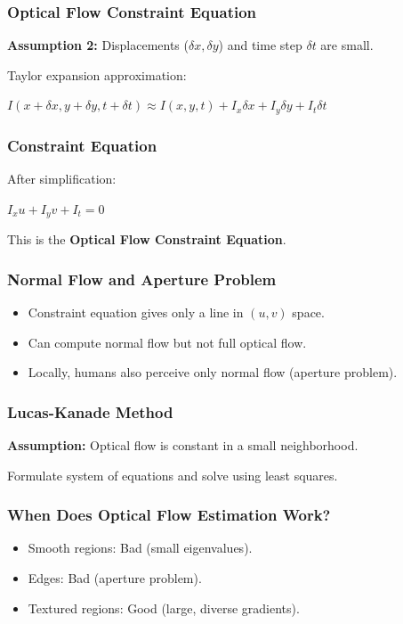 \begin{frame}
  \frametitle{Optical Flow Constraint Equation}
\textbf{Assumption 2:} Displacements ($\delta x, \delta y$) and time step $\delta t$ are small.

Taylor expansion approximation:

$ I(x+\delta x, y+\delta y, t+\delta t) \approx I(x,y,t) + I_x \delta x + I_y \delta y + I_t \delta t $

\end{frame}

\begin{frame}
  \frametitle{Constraint Equation}
After simplification:

$ I_x u + I_y v + I_t = 0 $

This is the \textbf{Optical Flow Constraint Equation}.

\vspace{0.5cm}
\centering
\end{frame}

\begin{frame}
  \frametitle{Normal Flow and Aperture Problem}
\begin{itemize}
  \item Constraint equation gives only a line in $(u,v)$ space.
  \item Can compute normal flow but not full optical flow.
  \item Locally, humans also perceive only normal flow (aperture problem).
\end{itemize}

\vspace{0.5cm}
\centering
\end{frame}

\begin{frame}
  \frametitle{Lucas-Kanade Method}
\textbf{Assumption:} Optical flow is constant in a small neighborhood.

Formulate system of equations and solve using least squares.

\vspace{0.5cm}
\centering
\end{frame}

\begin{frame}
  \frametitle{When Does Optical Flow Estimation Work?}
\begin{itemize}
  \item Smooth regions: Bad (small eigenvalues).
  \item Edges: Bad (aperture problem).
  \item Textured regions: Good (large, diverse gradients).
\end{itemize}

\vspace{0.5cm}
\centering
\end{frame}

